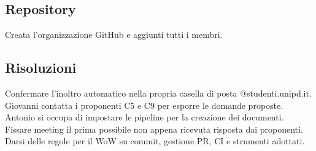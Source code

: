 \documentclass[12pt,a4paper]{article}
\begin{document}
\subsection{Repository}
Creata l'organizzazione GitHub e aggiunti tutti i membri.

\subsection{Risoluzioni}
Confermare l'inoltro automatico nella propria casella di posta @studenti.unipd.it.\\
Giovanni contatta i proponenti C5 e C9 per esporre le domande proposte.\\
Antonio si occupa di impostare le pipeline per la creazione dei documenti.\\
Fissare meeting il prima possibile non appena ricevuta risposta dai proponenti.\\
Darsi delle regole per il WoW su commit, gestione PR, CI e strumenti adottati.
\end{document}

